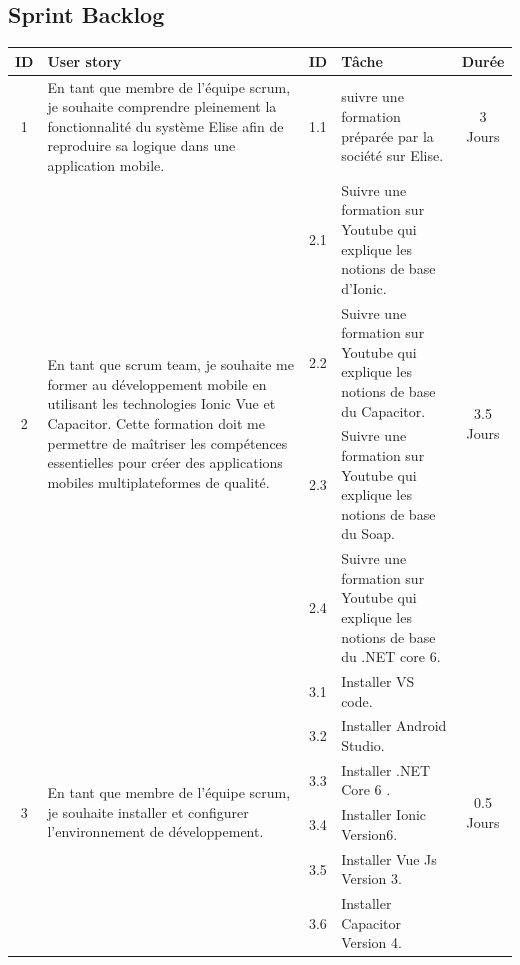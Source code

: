 \subsection{Sprint Backlog}

\begin{adjustwidth}{-1cm}{}
    
    \begin{longtable}{|c|p{6cm}|c|p{6cm}|c|}
      \hline
      \textbf{ID} & \textbf{User story} & \textbf{ID}  & \textbf{Tâche} & \textbf{Durée} \\
      \hline

    1 & En tant que membre de l'équipe scrum, je
    souhaite comprendre pleinement la fonctionnalité du système Elise afin de reproduire sa logique dans une application mobile. &  1.1 &suivre une formation préparée par la société sur Elise.&3 Jours\\
    \cline{1-5}
    \multirow{4}{*}{2} & \multirow{4}{6cm}{En tant que scrum team, je souhaite me former au développement mobile en utilisant les technologies Ionic Vue et Capacitor. Cette formation doit me permettre de maîtriser les compétences essentielles pour créer des applications mobiles multiplateformes de qualité.}  &  2.1 &Suivre une formation sur Youtube qui explique les notions de base d'Ionic.&\multirow{4}{2cm}{3.5 Jours}\\
    \cline{3-4}
    &  &  2.2 &Suivre une formation sur Youtube qui explique les notions de base du Capacitor.&\\
    \cline{3-4}
    &  &  2.3 &Suivre une formation sur Youtube qui explique les notions de base du Soap.&\\
    \cline{3-4}
    &  &  2.4 &Suivre une formation sur Youtube qui explique les notions de base du .NET core 6.&\\
    \cline{1-5}
    \multirow{7}{*}{3} & \multirow{7}{6cm}{En tant que membre de l'équipe scrum, je souhaite installer et configurer l'environnement de développement.} &  3.1 &Installer VS code.&\multirow{7}{2cm}{0.5 Jours}\\
    \cline{3-4}
    &  &  3.2 &Installer Android Studio.&\\
    \cline{3-4}
    &  &  3.3 &Installer .NET Core 6 .&\\
    \cline{3-4}
    &  &  3.4 &Installer Ionic Version6.&\\
    \cline{3-4}
    &  &  3.5 &Installer Vue Js Version 3.&\\
    \cline{3-4}
    &  &  3.6 &Installer Capacitor Version 4.&\\

\end{longtable}
\end{adjustwidth}
